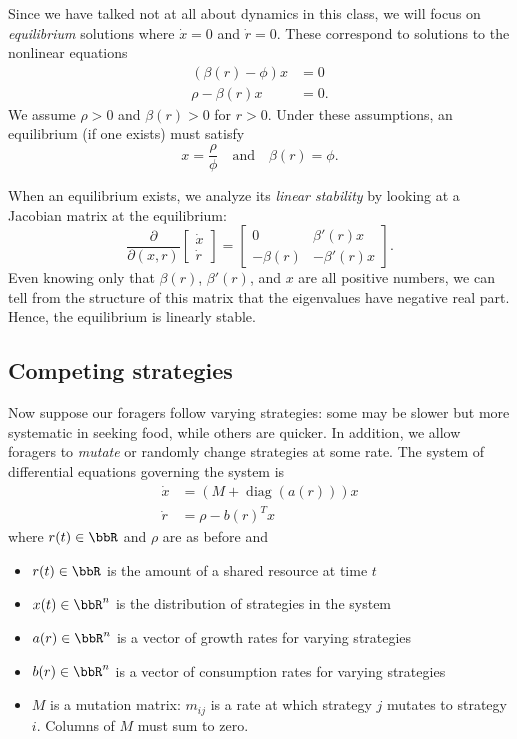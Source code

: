 \documentclass[12pt, leqno]{article} %
\begin{document}
Since we have talked not at all about dynamics in this
class, we will focus on {\em equilibrium} solutions where
$\dot{x} = 0$ and $\dot{r} = 0$.  These correspond to solutions to
the nonlinear equations
\begin{align*}
  (\beta(r)-\phi) x & = 0 \\
  \rho - \beta(r) x & = 0.
\end{align*}
We assume $\rho > 0$ and $\beta(r) > 0$ for $r > 0$.  Under these
assumptions, an equilibrium (if one exists) must satisfy
\[
  x = \frac{\rho}{\phi} \quad \mbox{and} \quad
  \beta(r) = \phi.
\]

When an equilibrium exists, we analyze its {\em linear stability} by
looking at a Jacobian matrix at the equilibrium:
\[
\frac{\partial}{\partial (x,r)}
\begin{bmatrix} \dot{x} \\ \dot{r} \end{bmatrix} =
\begin{bmatrix}
  0 & \beta'(r) x \\
  -\beta(r) & -\beta'(r) x
\end{bmatrix}.
\]
Even knowing only that $\beta(r)$, $\beta'(r)$, and $x$ are all
positive numbers, we can tell from the structure of this matrix that
the eigenvalues have negative real part.  Hence, the equilibrium is
linearly stable.

\subsection{Competing strategies}

Now suppose our foragers follow varying strategies: some may be slower
but more systematic in seeking food, while others are quicker.  In
addition, we allow foragers to {\em mutate} or randomly change
strategies at some rate.  The system of differential equations
governing the system is
\begin{align*}
  \dot{x} &= \left(M + \operatorname{diag}(a(r))\right) x \\
  \dot{r} &= \rho - b(r)^T x
\end{align*}
where $r(t) \in \bbR$ and $\rho$ are as before and
\begin{itemize}
\item $r(t) \in \bbR$ is the amount of a shared resource at time $t$
\item $x(t) \in \bbR^n$ is the distribution of strategies in the system
\item $a(r) \in \bbR^n$ is a vector of growth rates for varying
  strategies
\item $b(r) \in \bbR^n$ is a vector of consumption rates for varying strategies
\item $M$ is a mutation matrix: $m_{ij}$ is a rate at which strategy
  $j$ mutates to strategy $i$.  Columns of $M$ must sum to zero.
\end{itemize}
\end{document}
